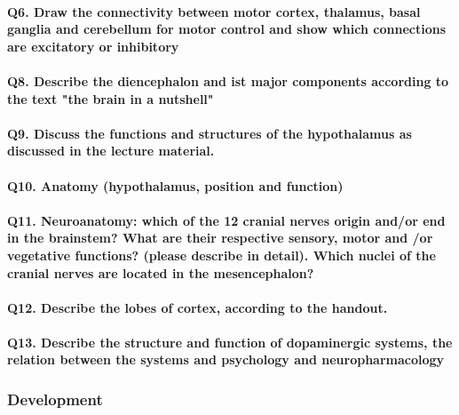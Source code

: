 \documentclass[12pt,article,oneside,a4paper]{memoir}
\begin{document}
\paragraph{Q6. Draw the connectivity between motor cortex, thalamus, basal ganglia and cerebellum for motor control and show which connections are excitatory or inhibitory}


\paragraph{Q8. Describe the diencephalon and ist major components according to the text "the brain in a nutshell"}

\paragraph{Q9. Discuss the functions and structures of the hypothalamus as discussed in the lecture material.}

\paragraph{Q10. Anatomy (hypothalamus, position and function)}

\paragraph{Q11. Neuroanatomy: which of the 12 cranial nerves origin and/or end in the brainstem? What are their respective sensory, motor and /or vegetative functions? (please describe in detail). Which nuclei of the cranial nerves are located in the mesencephalon?}

\paragraph{Q12. Describe the lobes of cortex, according to the handout.} 

\paragraph{Q13. Describe the structure and function of dopaminergic systems, the relation between the systems and psychology and neuropharmacology}

\subsubsection{Development}
\end{document}
